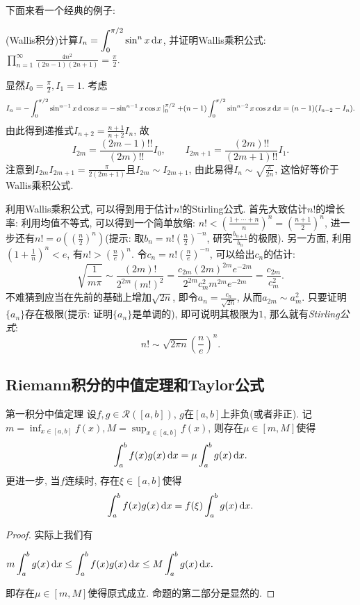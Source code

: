 下面来看一个经典的例子: 

\begin{example}
	(Wallis积分)计算$\displaystyle I_n=\int_0^{\pi /2} \sin ^n x \mathop{}\!\mathrm{d} x$, 并证明Wallis乘积公式: $\displaystyle \prod_{n=1}^{\infty} \frac{4n^2}{(2n-1)(2n+1)}=\frac{\pi}{2}$. 
\end{example}
\begin{solution}
	显然$I_0=\frac{\pi}{2},I_1=1$. 考虑$$I_n = -\int_{0}^{\pi /2} \sin ^{n-1}x \mathop{}\!\mathrm{d} \cos x = -\sin ^{n-1}x \cos x \mid_{0}^{\pi /2} + (n-1)\int_{0}^{\pi /2} \sin ^{n-2}x \cos x \mathop{}\!\mathrm{d} x = (n-1)(I_{n-2}-I_n). $$
	由此得到递推式$I_{n+2}=\frac{n+1}{n+2} I_n$, 故$$I_{2m}= \frac{(2m-1)!!}{(2m)!!} I_0,\qquad I_{2m+1} = \frac{(2m)!!}{(2m+1)!!} I_1.$$
	注意到$I_{2m}I_{2m+1} = \frac{\pi}{2(2m+1)}$且$I_{2m} \sim I_{2m+1}$, 由此易得$I_n \sim \sqrt{\frac{\pi}{2n}}$, 这恰好等价于Wallis乘积公式. 
\end{solution}

利用Wallis乘积公式, 可以得到用于估计$n!$的Stirling公式. 首先大致估计$n!$的增长率: 利用均值不等式, 可以得到一个简单放缩: $n! < (\frac{1+\cdots +n}{n})^n = (\frac{n+1}{2})^n$, 进一步还有$n!=o((\frac{n}{2})^n)$(提示: 取$b_n=n!(\frac{n}{2})^{-n}$, 研究$\frac{b_{n+1}}{b_n}$的极限). 另一方面, 利用$(1+\frac{1}{n})^n<e$, 有$n! > (\frac{n}{e})^n$. 令$c_n=n!(\frac{n}{e})^{-n}$, 可以给出$c_n$的估计: $$\sqrt{\frac{1}{m\pi}} \sim \frac{(2m)!}{2^{2m}(m!)^2} = \frac{c_{2m} (2m)^{2m} e^{-2m}}{2^{2m} c_m^2 m^{2m} e^{-2m}} = \frac{c_{2m}}{c_m^2}.$$
不难猜到应当在先前的基础上增加$\sqrt{2n}$, 即令$a_n = \frac{c_n}{\sqrt{2n}}$, 从而$a_{2m} \sim a_m^2$. 只要证明$\{a_n \}$存在极限(提示: 证明$\{ a_n \}$是单调的), 即可说明其极限为$1$, 那么就有\textit{Stirling公式}: $$n! \sim \sqrt{2\pi n} \left( \frac{n}{e} \right)^n.$$



\subsection{Riemann积分的中值定理和Taylor公式}

\begin{theorem}{第一积分中值定理}
	设$f,g \in \mathcal{R}([a,b])$, $g$在$[a,b]$上非负(或者非正). 记$m=\inf_{x\in [a,b]}f(x),M=\sup_{x\in [a,b]}f(x)$, 则存在$\mu \in [m,M]$使得$$\int_a^b f(x)g(x)\mathop{}\!\mathrm{d} x = \mu \int_a^b g(x) \mathop{}\!\mathrm{d} x.$$
	更进一步, 当$f$连续时, 存在$\xi \in [a,b]$使得$$\int_a^b f(x)g(x)\mathop{}\!\mathrm{d} x = f(\xi) \int_a^b g(x) \mathop{}\!\mathrm{d} x.$$
\end{theorem}
\begin{proof}
	实际上我们有
	\begin{center}
		$\displaystyle m \int_a^b g(x) \mathop{}\!\mathrm{d} x \leq \int_a^b f(x)g(x)\mathop{}\!\mathrm{d} x \leq M \int_a^b g(x) \mathop{}\!\mathrm{d} x.$
	\end{center}
	即存在$\mu \in [m,M]$使得原式成立. 命题的第二部分是显然的. 
\end{proof}

